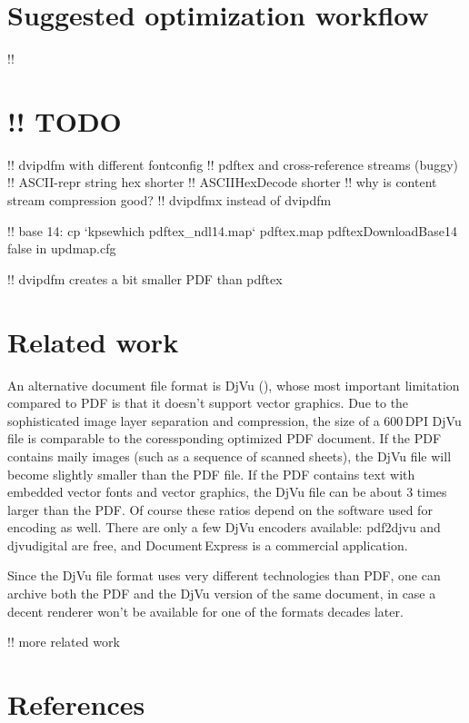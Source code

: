\documentclass{ltugproc}
\def\cmd{\textsf}
\begin{document}
\section{Suggested optimization workflow}\label{optimize}
!!

\section{!! TODO}

!! dvipdfm with different fontconfig
!! pdftex and cross-reference streams (buggy)
!! ASCII-repr string hex shorter
!! ASCIIHexDecode shorter
!! why is content stream compression good?
!! dvipdfmx instead of dvipdfm

!! base 14: cp `kpsewhich pdftex\_ndl14.map` pdftex.map
pdftexDownloadBase14 false in updmap.cfg

!! dvipdfm creates a bit smaller PDF than pdftex

\section{Related work}\label{related-work}

An alternative document file format is DjVu (\cite{djvu,djvu-tutorial}),
whose most important limitation compared to PDF is that it doesn't support
vector graphics. Due to the sophisticated image layer separation and
compression, the size of a 600\,DPI DjVu file is comparable to the
coressponding optimized PDF document. If the PDF contains maily images (such
as a sequence of scanned sheets), the DjVu file will become slightly smaller
than the PDF file. If the PDF contains text with embedded vector fonts and
vector graphics, the DjVu file can be about 3 times larger than the PDF.
Of course these ratios depend on the software used for encoding as well.
There are only a few DjVu encoders available: \cmd{pdf2djvu} and
\cmd{djvudigital} are free, and Document\,Express is a commercial
application.

Since the DjVu file format uses very different technologies than PDF, one
can archive both the PDF and the DjVu version of the same document, in case
a decent renderer won't be available for one of the formats decades later.

!! more related work

\section{References}
\end{document}
